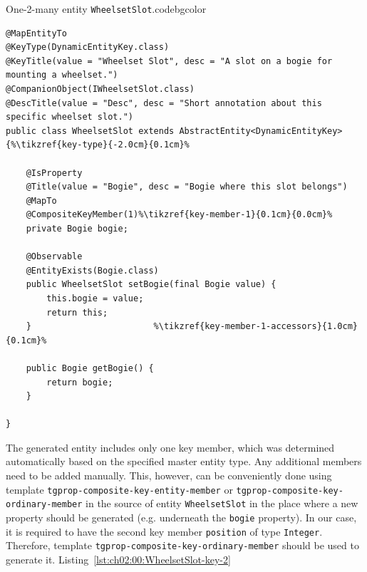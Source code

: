   \begin{code}{One-2-many entity \texttt{WheelsetSlot}.}{\label{lst:ch02:00:WheelsetSlot}}{codebgcolor}
  \begin{lstlisting}
@MapEntityTo
@KeyType(DynamicEntityKey.class)
@KeyTitle(value = "Wheelset Slot", desc = "A slot on a bogie for mounting a wheelset.")
@CompanionObject(IWheelsetSlot.class)
@DescTitle(value = "Desc", desc = "Short annotation about this specific wheelset slot.")
public class WheelsetSlot extends AbstractEntity<DynamicEntityKey> {%\tikzref{key-type}{-2.0cm}{0.1cm}%

    @IsProperty
    @Title(value = "Bogie", desc = "Bogie where this slot belongs")
    @MapTo
    @CompositeKeyMember(1)%\tikzref{key-member-1}{0.1cm}{0.0cm}%
    private Bogie bogie;

    @Observable
    @EntityExists(Bogie.class)
    public WheelsetSlot setBogie(final Bogie value) {
        this.bogie = value;
        return this;
    }                        %\tikzref{key-member-1-accessors}{1.0cm}{0.1cm}%

    public Bogie getBogie() {
        return bogie;
    }

}
  \end{lstlisting}
  \vspace*{-7px}
\end{code}          
    
    The generated entity includes only one key member, which was determined automatically based on the specified master entity type.
    Any additional members need to be added manually.
    This, however, can be conveniently done using template \texttt{tgprop-composite-key-entity-member} or \texttt{tgprop-composite-key-ordinary-member} in the source of entity \texttt{WheelsetSlot} in the place where a new property should be generated (e.g. underneath the \texttt{bogie} property).
    In our case, it is required to have the second key member \texttt{position} of type \texttt{Integer}.
    Therefore, template \texttt{tgprop-composite-key-ordinary-member} should be used to generate it.
    Listing~\ref{lst:ch02:00:WheelsetSlot-key-2} 
    
